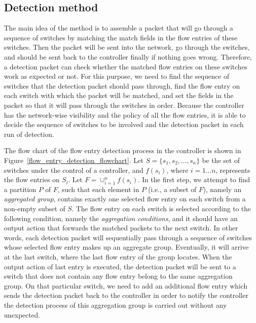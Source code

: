 \subsection{Detection method}
\label{Detection_method}
The main idea of the method is to assemble a packet that will go through a sequence of switches by matching the match fields in the flow entries of these switches. Then the packet will be sent into the network, go through the switches, and should be sent back to the controller finally if nothing goes wrong. Therefore, a detection packet can check whether the matched flow entries on these switches work as expected or not. For this purpose, we need to find the sequence of switches that the detection packet should pass through, find the flow entry on each switch with which the packet will be matched, and set the fields in the packet so that it will pass through the switches in order. Because the controller has the network-wise visibility and the policy of all the flow entries, it is able to decide the sequence of switches to be involved and the detection packet in each run of detection.

The flow chart of the flow entry detection process in the controller is shown in Figure~\ref{flow_entry_detection_flowchart}. Let $S=\{s_1,s_2,\ldots,s_n\}$ be the set of switches under the control of a controller, and $f(s_i)$, where $i=1\ldots n$, represents the flow entries on $S_i$. Let $F=\cup_{i=1}^n f(s_i)$. In the first step, we attempt to find a partition $P$ of $F$, such that each element in $P$ (i.e., a subset of $F$), namely an \textit{aggregated group}, contains exactly one selected flow entry on each switch from a non-empty subset of $S$. The flow entry on each switch is selected according to the following condition, namely the \textit{aggregation conditions}, and it should have an output action that forwards the matched packets to the next switch. In other words, each detection packet will sequentially pass through a sequence of switches whose selected flow entry makes up an aggregate group. Eventually, it will arrive at the last switch, where the last flow entry of the group locates. When the output action of last entry is executed, the detection packet will be sent to a switch that does not contain any flow entry belong to the same aggregation group. On that particular switch, we need to add an additional flow entry which sends the detection packet back to the controller in order to notify the controller the detection process of this aggregation group is carried out without any unexpected. 

